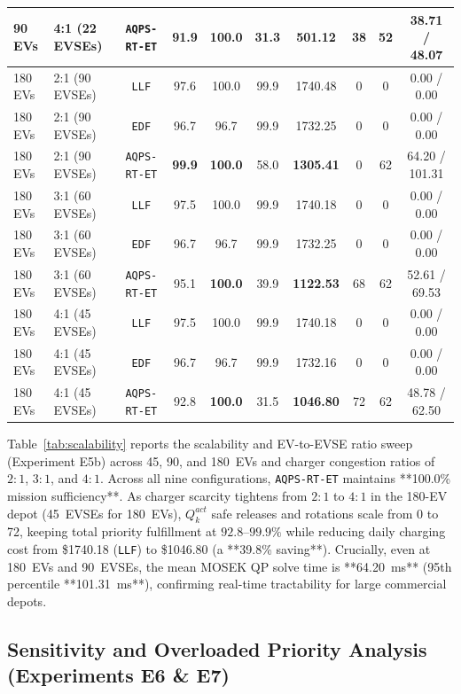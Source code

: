 \documentclass[final,3p,times,twocolumn]{elsarticle}
\begin{document}
\begin{table}[htbp]
\begin{tabular}{llcccccccc}
90 EVs  & 4:1 (22 EVSEs) & \texttt{AQPS-RT-ET} & \textbf{91.9}  & \textbf{100.0} & 31.3  & \textbf{501.12} & 38 & 52 & 38.71 / 48.07 \\
\midrule
180 EVs & 2:1 (90 EVSEs) & \texttt{LLF}        & 97.6  & 100.0 & 99.9  & 1740.48 & 0 & 0  & 0.00 / 0.00 \\
180 EVs & 2:1 (90 EVSEs) & \texttt{EDF}        & 96.7  & 96.7  & 99.9  & 1732.25 & 0 & 0  & 0.00 / 0.00 \\
180 EVs & 2:1 (90 EVSEs) & \texttt{AQPS-RT-ET} & \textbf{99.9}  & \textbf{100.0} & 58.0  & \textbf{1305.41} & 0 & 62 & 64.20 / 101.31 \\
180 EVs & 3:1 (60 EVSEs) & \texttt{LLF}        & 97.5  & 100.0 & 99.9  & 1740.18 & 0 & 0  & 0.00 / 0.00 \\
180 EVs & 3:1 (60 EVSEs) & \texttt{EDF}        & 96.7  & 96.7  & 99.9  & 1732.25 & 0 & 0  & 0.00 / 0.00 \\
180 EVs & 3:1 (60 EVSEs) & \texttt{AQPS-RT-ET} & 95.1  & \textbf{100.0} & 39.9  & \textbf{1122.53} & 68 & 62 & 52.61 / 69.53 \\
180 EVs & 4:1 (45 EVSEs) & \texttt{LLF}        & 97.5  & 100.0 & 99.9  & 1740.18 & 0 & 0  & 0.00 / 0.00 \\
180 EVs & 4:1 (45 EVSEs) & \texttt{EDF}        & 96.7  & 96.7  & 99.9  & 1732.16 & 0 & 0  & 0.00 / 0.00 \\
180 EVs & 4:1 (45 EVSEs) & \texttt{AQPS-RT-ET} & 92.8  & \textbf{100.0} & 31.5  & \textbf{1046.80} & 72 & 62 & 48.78 / 62.50 \\
\bottomrule
\end{tabular}
\end{table}

Table~\ref{tab:scalability} reports the scalability and EV-to-EVSE ratio sweep (Experiment E5b) across 45, 90, and 180~EVs and charger congestion ratios of $2:1$, $3:1$, and $4:1$. Across all nine configurations, \texttt{AQPS-RT-ET} maintains **100.0\% mission sufficiency**. As charger scarcity tightens from $2:1$ to $4:1$ in the 180-EV depot (45~EVSEs for 180~EVs), $Q_k^{act}$ safe releases and rotations scale from 0 to 72, keeping total priority fulfillment at $92.8\text{--}99.9\%$ while reducing daily charging cost from \$1740.18 (\texttt{LLF}) to \$1046.80 (a **39.8\% saving**). Crucially, even at 180~EVs and 90~EVSEs, the mean MOSEK QP solve time is **64.20~ms** (95th percentile **101.31~ms**), confirming real-time tractability for large commercial depots.

\subsection{Sensitivity and Overloaded Priority Analysis (Experiments E6 & E7)}
\label{sec:sensitivity}
\end{document}
